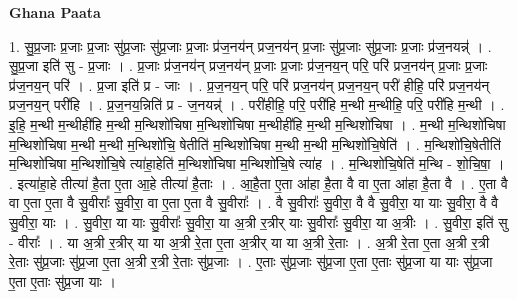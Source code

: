 \documentclass[17pt]{extarticle}
\begin{document}
\textbf{Ghana Paata } \newline

1. सु॒प्र॒जाः प्र॒जाः प्र॒जाः सु॑प्र॒जाः सु॑प्र॒जाः प्र॒जाः प्र॑ज॒नय॑न् प्रज॒नय॑न् प्र॒जाः सु॑प्र॒जाः सु॑प्र॒जाः प्र॒जाः प्र॑ज॒नयन्न्॑ । . सु॒प्र॒जा इति॑ सु - प्र॒जाः । . प्र॒जाः प्र॑ज॒नय॑न् प्रज॒नय॑न् प्र॒जाः प्र॒जाः प्र॑ज॒नय॒न् परि॒ परि॑ प्रज॒नय॑न् प्र॒जाः प्र॒जाः प्र॑ज॒नय॒न् परि॑ । . प्र॒जा इति॑ प्र - जाः । . प्र॒ज॒नय॒न् परि॒ परि॑ प्रज॒नय॑न् प्रज॒नय॒न् परी॑ हीहि॒ परि॑ प्रज॒नय॑न् प्रज॒नय॒न् परी॑हि । . प्र॒ज॒नय॒न्निति॑ प्र - ज॒नयन्न्॑ । . परी॑हीहि॒ परि॒ परी॑हि म॒न्थी म॒न्थीहि॒ परि॒ परी॑हि म॒न्थी । . इ॒हि॒ म॒न्थी म॒न्थीही॑हि म॒न्थी म॒न्थिशो॑चिषा म॒न्थिशो॑चिषा म॒न्थीही॑हि म॒न्थी म॒न्थिशो॑चिषा । . म॒न्थी म॒न्थिशो॑चिषा म॒न्थिशो॑चिषा म॒न्थी म॒न्थी म॒न्थिशो॑चि॒ षेतीति॑ म॒न्थिशो॑चिषा म॒न्थी म॒न्थी म॒न्थिशो॑चि॒षेति॑ । . म॒न्थिशो॑चि॒षेतीति॑ म॒न्थिशो॑चिषा म॒न्थिशो॑चि॒षे त्या॑हा॒हेति॑ म॒न्थिशो॑चिषा म॒न्थिशो॑चि॒षे त्या॑ह । . म॒न्थिशो॑चि॒षेति॑ म॒न्थि - शो॒चि॒षा॒ । . इत्या॑हा॒हे तीत्या॑ है॒ता ए॒ता आ॒हे तीत्या॑ है॒ताः । . आ॒है॒ता ए॒ता आ॑हा है॒ता वै वा ए॒ता आ॑हा है॒ता वै । . ए॒ता वै वा ए॒ता ए॒ता वै सु॒वीराः᳚ सु॒वीरा॒ वा ए॒ता ए॒ता वै सु॒वीराः᳚ । . वै सु॒वीराः᳚ सु॒वीरा॒ वै वै सु॒वीरा॒ या याः सु॒वीरा॒ वै वै सु॒वीरा॒ याः । . सु॒वीरा॒ या याः सु॒वीराः᳚ सु॒वीरा॒ या अ॒त्री र॒त्रीर् याः सु॒वीराः᳚ सु॒वीरा॒ या अ॒त्रीः । . सु॒वीरा॒ इति॑ सु - वीराः᳚ । . या अ॒त्री र॒त्रीर् या या अ॒त्री रे॒ता ए॒ता अ॒त्रीर् या या अ॒त्री रे॒ताः । . अ॒त्री रे॒ता ए॒ता अ॒त्री र॒त्री रे॒ताः सु॑प्र॒जाः सु॑प्र॒जा ए॒ता अ॒त्री र॒त्री रे॒ताः सु॑प्र॒जाः । . ए॒ताः सु॑प्र॒जाः सु॑प्र॒जा ए॒ता ए॒ताः सु॑प्र॒जा या याः सु॑प्र॒जा ए॒ता ए॒ताः सु॑प्र॒जा याः । \newline
\end{document}
